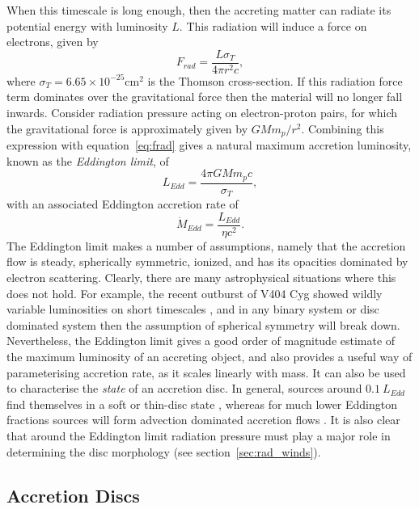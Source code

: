 When this timescale is long enough, then the accreting matter
can radiate its potential energy with luminosity $L$. 
This radiation will induce a force on electrons, given by
\begin{equation}
F_{rad} = \frac{L \sigma_T}{4 \pi r^2 c},
\label{eq:frad}
\end{equation} 
where $\sigma_T = 6.65\times10^{-25}$cm$^2$ is the Thomson cross-section.
If this radiation force term dominates over the gravitational
force then the material will no longer fall inwards. Consider
radiation pressure acting on electron-proton pairs, for which the gravitational
force is approximately given by $G M m_p / r^2$. Combining this expression
with equation~\ref{eq:frad} gives a natural
maximum accretion luminosity, known as the {\em Eddington limit}, of
\begin{equation}
L_{Edd} = \frac{4 \pi G M m_p c}{\sigma_T},
\label{eq:bondi}
\end{equation} 
with an associated Eddington accretion rate of 
\begin{equation}
\dot{M}_{Edd} = \frac{L_{Edd}}{\eta c^2}.
\label{eq:bondi}
\end{equation} 
The Eddington limit makes a number of assumptions, namely
that the accretion flow is steady, spherically symmetric, ionized,
and has its opacities dominated by electron scattering.
Clearly, there are many astrophysical situations where this does not hold.
For example, the recent outburst of V404 Cyg showed wildly variable
luminosities on short timescales 
\citep[see, e.g.,][among many, many ATels]{kuulkers_atel2015,motta_atel2015}, 
and in any binary system
or disc dominated system then the assumption of spherical symmetry will
break down. Nevertheless, the Eddington limit gives a good order of magnitude 
estimate of the maximum luminosity of an accreting object,
and also provides a useful way of parameterising accretion rate,
as it scales linearly with mass. It can also be used
to characterise the {\em state} of an accretion disc.  
In general, sources around $0.1~L_{Edd}$ find themselves in a 
soft or thin-disc state , whereas for much lower Eddington 
fractions sources will form advection dominated accretion flows
\citep[ADAFs; ][]{narayan1994,narayan1995}.
It is also clear that around the Eddington limit radiation pressure
must play a major role in determining the disc morphology 
(see section~\ref{sec:rad_winds}).

\subsection{Accretion Discs}

